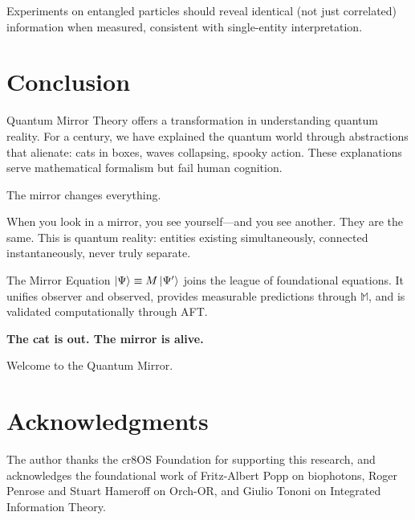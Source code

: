 \documentclass[12pt,a4paper]{article}
\begin{document}
Experiments on entangled particles should reveal identical (not just correlated) information when measured, consistent with single-entity interpretation.

\section{Conclusion}

Quantum Mirror Theory offers a transformation in understanding quantum reality. For a century, we have explained the quantum world through abstractions that alienate: cats in boxes, waves collapsing, spooky action. These explanations serve mathematical formalism but fail human cognition.

The mirror changes everything.

When you look in a mirror, you see yourself---and you see another. They are the same. This is quantum reality: entities existing simultaneously, connected instantaneously, never truly separate.

The Mirror Equation $\ket{\Psi} \equiv M\ket{\Psi'}$ joins the league of foundational equations. It unifies observer and observed, provides measurable predictions through $\mathbb{M}$, and is validated computationally through AFT.

\textbf{The cat is out. The mirror is alive.}

Welcome to the Quantum Mirror.

\section*{Acknowledgments}

The author thanks the cr8OS Foundation for supporting this research, and acknowledges the foundational work of Fritz-Albert Popp on biophotons, Roger Penrose and Stuart Hameroff on Orch-OR, and Giulio Tononi on Integrated Information Theory.
\end{document}
